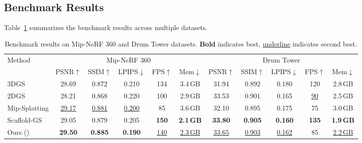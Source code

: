 \subsection{Benchmark Results}
\label{sec:benchmark:results}

Table~\ref{tab:benchmark} summarizes the benchmark results across
multiple datasets.

\begin{table}[t]
    \centering
    \caption{Benchmark results on Mip-NeRF 360 and Drum Tower datasets.
    \textbf{Bold} indicates best, \underline{underline} indicates second best.}
    \label{tab:benchmark}
    \begin{tabular}{l|ccccc|ccccc}
        \toprule
        \multirow{2}{*}{Method} & \multicolumn{5}{c|}{Mip-NeRF 360} & \multicolumn{5}{c}{Drum Tower} \\
        & PSNR$\uparrow$ & SSIM$\uparrow$ & LPIPS$\downarrow$ & FPS$\uparrow$ & Mem$\downarrow$ & PSNR$\uparrow$ & SSIM$\uparrow$ & LPIPS$\downarrow$ & FPS$\uparrow$ & Mem$\downarrow$ \\
        \midrule
        3DGS \cite{kerbl3Dgaussians}      & 28.69 & 0.872 & 0.210 & 134 & 3.4\,GB & 31.94 & 0.892 & 0.180 & 120 & 2.8\,GB \\
        2DGS \cite{huang20242dgs}         & 28.21 & 0.868 & 0.220 & 100 & 2.9\,GB & 33.53 & 0.901 & 0.165 & \underline{90} & 2.5\,GB \\
        Mip-Splatting \cite{yu2024mipsplatting} & \underline{29.17} & \underline{0.881} & \underline{0.200} & 85 & 3.6\,GB & 32.10 & 0.895 & 0.175 & 75 & 3.0\,GB \\
        Scaffold-GS \cite{yu2024scaffold} & 29.05 & 0.879 & 0.205 & \textbf{150} & \textbf{2.1\,GB} & \textbf{33.80} & \textbf{0.905} & \textbf{0.160} & \textbf{135} & \textbf{1.9\,GB} \\
        \midrule
        Ours (\ours{})                    & \textbf{29.50} & \textbf{0.885} & \textbf{0.190} & \underline{140} & \underline{2.3\,GB} & \underline{33.65} & \underline{0.903} & \underline{0.162} & 85 & \underline{2.2\,GB} \\
        \bottomrule
    \end{tabular}
\end{table}

